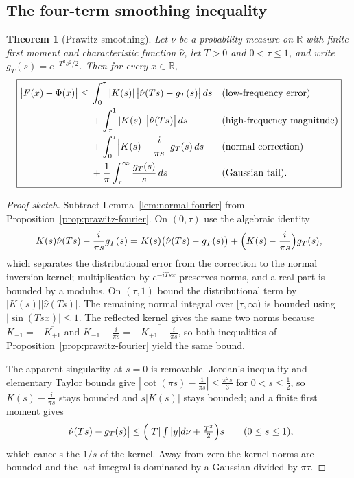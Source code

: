 \documentclass[10pt,a4paper]{article}
\theoremstyle{plain}
\newtheorem{theorem}{Theorem}[section]
\theoremstyle{definition}
\newcommand{\R}{\mathbb{R}}
\begin{document}
\subsection{The four-term smoothing inequality}

\begin{theorem}[Prawitz smoothing]\label{thm:smoothing}
Let $\nu$ be a probability measure on $\R$ with finite first moment and
characteristic function $\hat\nu$, let $T>0$ and $0<\tau\le1$, and write
$g_T(s)=e^{-T^2s^2/2}$. Then for every $x\in\R$,
\[
  \boxed{
  \begin{aligned}
  \bigl|F(x)-\Phi(x)\bigr| \le{}&
    \int_0^\tau |K(s)|\,\bigl|\hat\nu(Ts)-g_T(s)\bigr|\,ds
    &&\text{(low-frequency error)}\\
  &+ \int_\tau^1 |K(s)|\,\bigl|\hat\nu(Ts)\bigr|\,ds
    &&\text{(high-frequency magnitude)}\\
  &+ \int_0^\tau \Bigl|K(s)-\frac{i}{\pi s}\Bigr|\,g_T(s)\,ds
    &&\text{(normal correction)}\\
  &+ \frac1\pi\int_\tau^\infty \frac{g_T(s)}{s}\,ds
    &&\text{(Gaussian tail).}
  \end{aligned}}
\]
\end{theorem}

\begin{proof}[Proof sketch]
Subtract Lemma~\ref{lem:normal-fourier} from
Proposition~\ref{prop:prawitz-fourier}. On $(0,\tau)$ use the algebraic
identity
\[
  K(s)\hat\nu(Ts) - \frac{i}{\pi s}g_T(s)
  = K(s)\bigl(\hat\nu(Ts)-g_T(s)\bigr)
    + \Bigl(K(s)-\frac{i}{\pi s}\Bigr)g_T(s),
\]
which separates the distributional error from the correction to the normal
inversion kernel; multiplication by $e^{-iTsx}$ preserves norms, and a real
part is bounded by a modulus. On $(\tau,1)$ bound the distributional term by
$|K(s)||\hat\nu(Ts)|$. The remaining normal integral over $[\tau,\infty)$ is
bounded using $|\sin(Tsx)|\le1$. The reflected kernel gives the same two norms
because $K_{-1}=-\overline{K_{+1}}$ and
$K_{-1}-\tfrac{i}{\pi s}=-\overline{K_{+1}-\tfrac{i}{\pi s}}$, so both
inequalities of Proposition~\ref{prop:prawitz-fourier} yield the same bound.

The apparent singularity at $s=0$ is removable. Jordan's inequality and
elementary Taylor bounds give
$|\cot(\pi s)-\tfrac1{\pi s}|\le\tfrac{\pi^2s}{3}$ for $0<s\le\tfrac12$, so
$K(s)-\tfrac{i}{\pi s}$ stays bounded and $s|K(s)|$ stays bounded; and a
finite first moment gives
\[
  \bigl|\hat\nu(Ts)-g_T(s)\bigr|
  \le \Bigl(|T|\textstyle\int|y|d\nu + \frac{T^2}{2}\Bigr)s
  \qquad (0\le s\le1),
\]
which cancels the $1/s$ of the kernel. Away from zero the kernel norms are
bounded and the last integral is dominated by a Gaussian divided by $\pi\tau$.
\end{proof}
\end{document}
